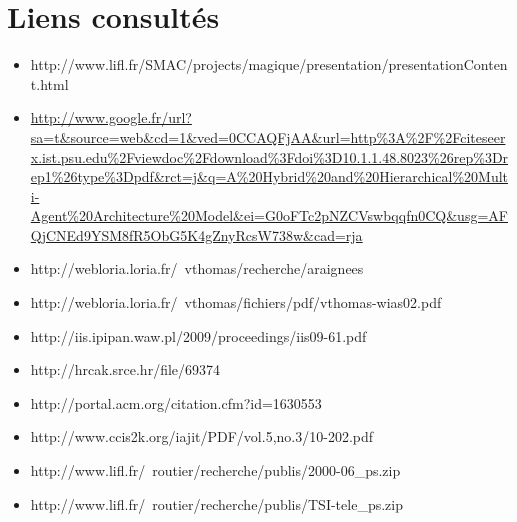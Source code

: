 \section{Liens consultés}

\begin{itemize}
  \item http://www.lifl.fr/SMAC/projects/magique/presentation/presentationContent.html
  \item \url{http://www.google.fr/url?sa=t&source=web&cd=1&ved=0CCAQFjAA&url=http%3A%2F%2Fciteseerx.ist.psu.edu%2Fviewdoc%2Fdownload%3Fdoi%3D10.1.1.48.8023%26rep%3Drep1%26type%3Dpdf&rct=j&q=A%20Hybrid%20and%20Hierarchical%20Multi-Agent%20Architecture%20Model&ei=G0oFTc2pNZCVswbqqfn0CQ&usg=AFQjCNEd9YSM8fR5ObG5K4gZnyRcsW738w&cad=rja}
  \item http://webloria.loria.fr/~vthomas/recherche/araignees
  \item http://webloria.loria.fr/~vthomas/fichiers/pdf/vthomas-wias02.pdf

  \item http://iis.ipipan.waw.pl/2009/proceedings/iis09-61.pdf
  \item http://hrcak.srce.hr/file/69374
  \item http://portal.acm.org/citation.cfm?id=1630553
  \item http://www.ccis2k.org/iajit/PDF/vol.5,no.3/10-202.pdf
  \item http://www.lifl.fr/~routier/recherche/publis/2000-06\_ps.zip
  \item http://www.lifl.fr/~routier/recherche/publis/TSI-tele\_ps.zip
\end{itemize}



